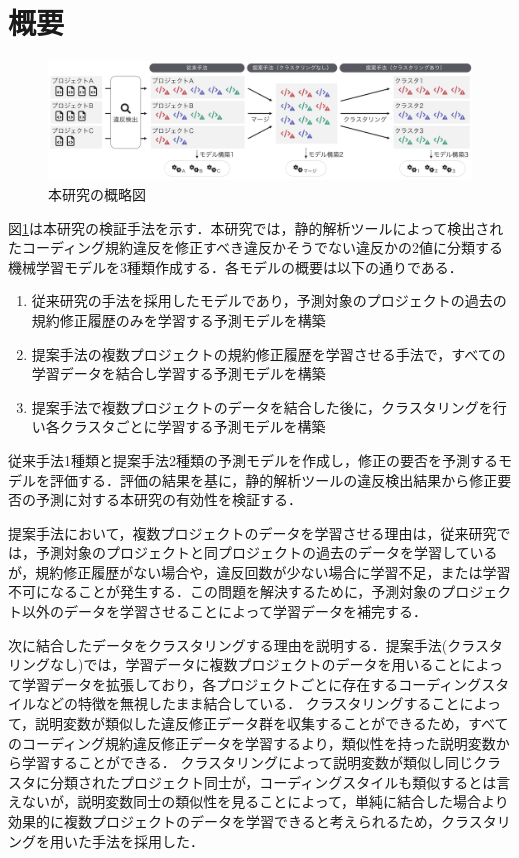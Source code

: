\documentclass[11pt,dvipdfmx]{jreport}
\begin{document}
\section{概要}

\begin{figure}[t]
	\centering
	\includegraphics[width=1.0\linewidth]{Kameoka_fig/kameoka_fig1.pdf}
	\caption{本研究の概略図}
	\label{fig:Teiannsyuhou}
\end{figure}

図\ref{fig:Teiannsyuhou}は本研究の検証手法を示す．本研究では，静的解析ツールによって検出されたコーディング規約違反を修正すべき違反かそうでない違反かの2値に分類する機械学習モデルを3種類作成する．各モデルの概要は以下の通りである．

\begin{enumerate}
  \item 従来研究の手法を採用したモデルであり，予測対象のプロジェクトの過去の規約修正履歴のみを学習する予測モデルを構築
  \item 提案手法の複数プロジェクトの規約修正履歴を学習させる手法で，すべての学習データを結合し学習する予測モデルを構築
  \item 提案手法で複数プロジェクトのデータを結合した後に，クラスタリングを行い各クラスタごとに学習する予測モデルを構築
\end{enumerate}

従来手法1種類と提案手法2種類の予測モデルを作成し，修正の要否を予測するモデルを評価する．評価の結果を基に，静的解析ツールの違反検出結果から修正要否の予測に対する本研究の有効性を検証する．

提案手法において，複数プロジェクトのデータを学習させる理由は，従来研究では，予測対象のプロジェクトと同プロジェクトの過去のデータを学習しているが，規約修正履歴がない場合や，違反回数が少ない場合に学習不足，または学習不可になることが発生する．この問題を解決するために，予測対象のプロジェクト以外のデータを学習させることによって学習データを補完する．

次に結合したデータをクラスタリングする理由を説明する．提案手法(クラスタリングなし)では，学習データに複数プロジェクトのデータを用いることによって学習データを拡張しており，各プロジェクトごとに存在するコーディングスタイルなどの特徴を無視したまま結合している．
クラスタリングすることによって，説明変数が類似した違反修正データ群を収集することができるため，すべてのコーディング規約違反修正データを学習するより，類似性を持った説明変数から学習することができる．
クラスタリングによって説明変数が類似し同じクラスタに分類されたプロジェクト同士が，コーディングスタイルも類似するとは言えないが，説明変数同士の類似性を見ることによって，単純に結合した場合より効果的に複数プロジェクトのデータを学習できると考えられるため，クラスタリングを用いた手法を採用した．
\end{document}
